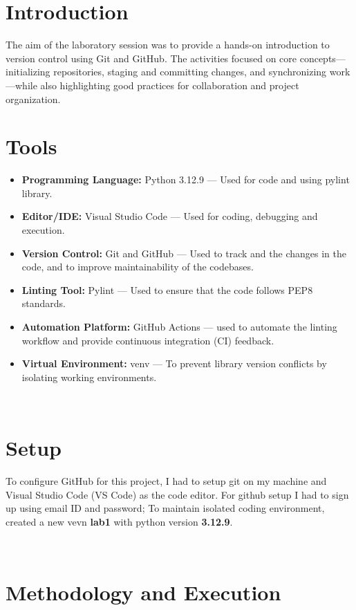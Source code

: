 \documentclass[12pt, a4paper]{report}
\begin{document}
\section{Introduction}

The aim of the laboratory session was to provide a hands-on introduction to version control using Git and GitHub. The activities focused on core concepts—initializing repositories, staging and committing changes, and synchronizing work—while also highlighting good practices for collaboration and project organization.
\
\section{Tools}

\begin{itemize}
    \item \textbf{Programming Language:} Python 3.12.9 --- Used for code and using pylint library.
    \item \textbf{Editor/IDE:} Visual Studio Code --- Used for coding, debugging and execution.
    \item \textbf{Version Control:} Git and GitHub --- Used to track and the changes in the code, and to improve maintainability of the codebases.
    \item \textbf{Linting Tool:} Pylint --- Used to ensure that the code follows PEP8 standards.
    \item \textbf{Automation Platform:} GitHub Actions --- used to automate the linting workflow and provide continuous integration (CI) feedback.
    \item \textbf{Virtual Environment:} venv --- To prevent library version conflicts by isolating working environments.
\end{itemize}

\
\section{Setup}

To configure GitHub for this project, I had to setup git on my machine and Visual Studio Code (VS Code) as the code editor. For github setup I had to sign up using email ID and password;
\newline 
To maintain isolated coding environment, created a new vevn \textbf{lab1} with python version \textbf{3.12.9}.

\
\section{Methodology and Execution}
\end{document}
